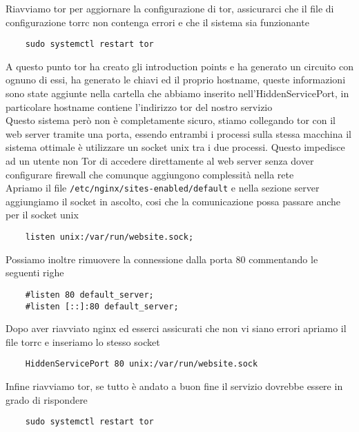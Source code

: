 Riavviamo tor per aggiornare la configurazione di tor, assicurarci che il file di configurazione torrc non contenga errori e che il sistema sia funzionante
\begin{lstlisting}
    sudo systemctl restart tor
\end{lstlisting}
A questo punto tor ha creato gli introduction points e ha generato un circuito con ognuno di essi, ha generato le chiavi ed il proprio hostname, queste informazioni sono state aggiunte nella cartella che abbiamo inserito nell'HiddenServicePort, in particolare hostname contiene l'indirizzo tor del nostro servizio \cite{SetupOnionService} \\
Questo sistema però non è completamente sicuro, stiamo collegando tor con il web server tramite una porta, essendo entrambi i processi sulla stessa macchina il sistema ottimale è utilizzare un socket unix tra i due processi. Questo impedisce ad un utente non Tor di accedere direttamente al web server senza dover configurare firewall che comunque aggiungono complessità nella rete \\
Apriamo il file \lstinline{/etc/nginx/sites-enabled/default} e nella sezione server aggiungiamo il socket in ascolto, cosi che la comunicazione possa passare anche per il socket unix
\begin{lstlisting}
    listen unix:/var/run/website.sock;
\end{lstlisting}
Possiamo inoltre rimuovere la connessione dalla porta 80 commentando le seguenti righe
\begin{lstlisting}
    #listen 80 default_server;
    #listen [::]:80 default_server;
\end{lstlisting}
Dopo aver riavviato nginx ed esserci assicurati che non vi siano errori apriamo il file torrc e inseriamo lo stesso socket
\begin{lstlisting}
    HiddenServicePort 80 unix:/var/run/website.sock
\end{lstlisting}
Infine riavviamo tor, se tutto è andato a buon fine il servizio dovrebbe essere in grado di rispondere
\begin{lstlisting}
    sudo systemctl restart tor
\end{lstlisting}


\newpage

